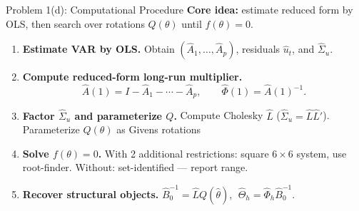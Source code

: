 \documentclass[aspectratio=169,11pt]{beamer}
\begin{document}
\begin{frame}{Problem 1(d): Computational Procedure}
    \textbf{Core idea:} estimate reduced form by OLS, then search over rotations $Q(\theta)$ until $f(\theta) = 0$.

    \begin{enumerate}
        \item \textbf{Estimate VAR by OLS.} Obtain $(\hat{A}_1,\ldots,\hat{A}_p)$, residuals $\hat{u}_t$, and $\hat{\Sigma}_u$.
        \vspace{0.2em}
        \item \textbf{Compute reduced-form long-run multiplier.}
        \[
        \hat{A}(1) = I - \hat{A}_1 - \cdots - \hat{A}_p, \qquad \hat\Phi(1) = \hat{A}(1)^{-1}.
        \]
        \vspace{-0.4em}
        \item \textbf{Factor $\hat\Sigma_u$ and parameterize $Q$.} Compute Cholesky $\hat{L}$ ($\hat\Sigma_u = \hat{L}\hat{L}'$). Parameterize $Q(\theta)$ as Givens rotations 
        \vspace{0.2em}
        \item \textbf{Solve $f(\theta) = 0$.} With 2 additional restrictions: square $6\times 6$ system, use root-finder. Without: set-identified --- report range.
        \vspace{0.2em}
        \item \textbf{Recover structural objects.} $\hat{B}_0^{-1} = \hat{L}Q(\hat\theta)$, $\;\hat\Theta_h = \hat\Phi_h \hat{B}_0^{-1}$.
    \end{enumerate}

\end{frame}
\end{document}
